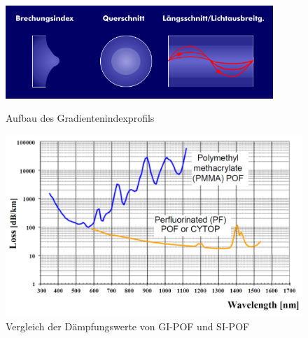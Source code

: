 \begin{figure}[h]
    \begin{center}
        \begin{minipage}[t]{0.4\textwidth}
            \begin{center}
                \includegraphics[width=0.9\textwidth]{Bilder/Optische_Wellenleiter_Die_Polymer_Optische_Faser/Brechzahlprofile/pofgi.png}
                \caption[Aufbau des Gradientenindexprofils \newline \url{http://www.itwissen.info/bilder/aufbau-und-brechungsprofil-der-gradientenfaser.png} (zuletzt aufgerufen am 19.09.2015)]{Aufbau des Gradientenindexprofils}
                \label{fig:pofgi}
            \end{center}
        \end{minipage}
        \hspace{0.025\textwidth}
        \begin{minipage}[t]{0.4\textwidth}
            \begin{center}
                \includegraphics[height=0.1\textheight]{Bilder/Optische_Wellenleiter_Die_Polymer_Optische_Faser/Brechzahlprofile/pofgidaempfung.png}
                \caption[Dämpfung bei einer GI-POF \newline \url{http://www.pofac.fh-nuernberg.de/pofac/de/was_sind_pof/images/gradientenindex_daempfung.png} (zuletzt aufgerufen am 19.09.2015)]{Vergleich der Dämpfungswerte von GI-POF und SI-POF}
                \label{fig:pofgidaempfung}
            \end{center}
        \end{minipage}
    \end{center}
\end{figure}
